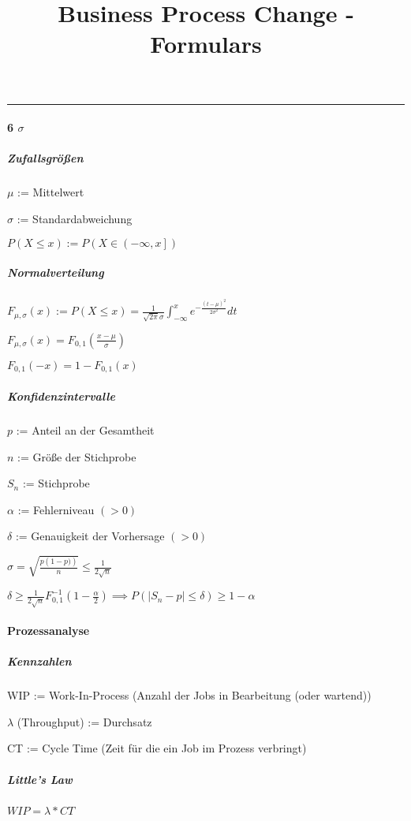 \documentclass[a4paper,12pt,smallheadings]{scrartcl}
\title{Business Process Change - Formulars}
\makeatletter
\let\thetitle\@title
\makeatother
\begin{document}
\thetitle
\hrule

\paragraph{6 $\sigma$}

\subparagraph{Zufallsgrößen}  \hfill

$\mu$ := Mittelwert

$\sigma$ := Standardabweichung

$P\left( X \leq x\right) := P\left( X \in \left( -\infty,x\right] \right) $

\subparagraph{Normalverteilung} \hfill

$F_{\mu,\sigma}\left(x\right)   := P\left(X \leq x\right) = \frac{1}{\sqrt{2\pi}\sigma} \int_{-\infty}^{x} e^{-\frac{{\left( t-\mu\right)}^2}{2\sigma^2}} dt$

$F_{\mu,\sigma}\left(x \right) = F_{0,1}\left(\frac{x-\mu}{\sigma} \right)$

$F_{0,1}\left(-x \right) = 1-F_{0,1}\left(x \right) $

\subparagraph{Konfidenzintervalle} \hfill

$p$ := Anteil an der Gesamtheit

$n$ := Größe der Stichprobe

$S_n$ := Stichprobe

$\alpha$ := Fehlerniveau $\left(> 0 \right)$

$\delta $ := Genauigkeit der Vorhersage $\left( >0  \right)$

$\sigma = \sqrt{\frac{p\left(1-p)\right)}{n}} \leq \frac{1}{2\sqrt{n}}$

$\delta \geq \frac{1}{2\sqrt{n}}F_{0,1}^{-1}\left( 1- \frac{\alpha}{2}\right) \implies P\left( \left| S_n - p \right| \leq \delta \right) \geq 1 - \alpha $

\paragraph{Prozessanalyse}

\subparagraph{Kennzahlen} \hfill

WIP := Work-In-Process (Anzahl der Jobs in Bearbeitung (oder wartend))

$\lambda$ (Throughput) := Durchsatz

CT := Cycle Time (Zeit für die ein Job im Prozess verbringt) 

\subparagraph{Little's Law}

$WIP = \lambda * CT$
\end{document}
